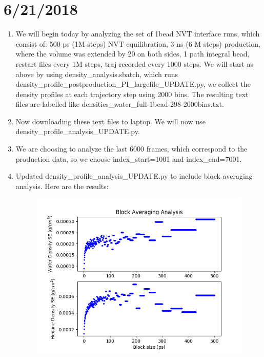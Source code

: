 \documentclass[12pt,reqno]{amsart}
\numberwithin{equation}{section}
\begin{document}
\section{6/21/2018}
\begin{enumerate}
\item We will begin today by analyzing the set of 1bead NVT interface runs, which consist of: 500 ps (1M steps) NVT equilibration, 3 ns (6 M steps) production, where the volume was extended by 20 on both sides, 1 path integral bead, restart files every 1M steps, traj recorded every 1000 steps.  We will start as above by using density\_analysis.sbatch, which runs density\_profile\_postproduction\_PI\_largefile\_UPDATE.py, we collect the density profiles at each trajectory step using 2000 bins.  The resulting text files are labelled like densities\_water\_full-1bead-298-2000bins.txt.  
\item Now downloading these text files to laptop.  We will now use density\_profile\_analysis\_UPDATE.py.  
\item We are choosing to analyze the last 6000 frames, which correspond to the production data, so we choose index\_start=1001 and index\_end=7001.  
\item Updated density\_profile\_analysis\_UPDATE.py to include block averaging analysis.  Here are the results:

\begin{figure}[H]
\centering
\includegraphics[scale=0.6]{density_profile_block_averaging_1_full-298-1bead}
\end{figure}


\end{enumerate}
\end{document}
